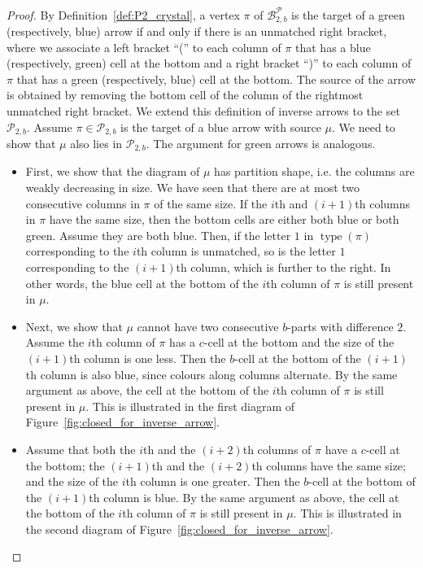 \documentclass[11pt]{article}
\theoremstyle{definition}
\theoremstyle{remark}
\theoremstyle{definition}
\numberwithin{equation}{section}
\newcommand{\type}{\operatorname{type}}
\begin{document}
\begin{proof}
By Definition~\ref{def:P2_crystal}, a vertex \(\pi\) of \(\mathcal{B}_{2,b}^{\mathcal{P}}\) is the target of a green (respectively, blue) arrow if and only if there is an unmatched right bracket, where we associate a left bracket ``('' to each column of \(\pi\) that has a blue (respectively, green) cell at the bottom and a right bracket ``)'' to each column of \(\pi\) that has a green (respectively, blue) cell at the bottom. The source of the arrow is obtained by removing the bottom cell of the column of the rightmost unmatched right bracket. We extend this definition of inverse arrows to the set \(\mathcal{P}_{2,b}\). Assume \(\pi\in\mathcal{P}_{2,b}\) is the target of a blue arrow with source \(\mu\). We need to show that \(\mu\) also lies in \(\mathcal{P}_{2,b}\). The argument for green arrows is analogous.
\begin{itemize}
\item First, we show that the diagram of \(\mu\) has partition shape, i.e. the columns are weakly decreasing in size. We have seen that there are at most two consecutive columns in \(\pi\) of the same size. If the \(i\)th and \((i+1)\)th columns in \(\pi\) have the same size, then the bottom cells are either both blue or both green. Assume they are both blue. Then, if the letter \(1\) in \(\type(\pi)\) corresponding to the \(i\)th column is unmatched, so is the letter \(1\) corresponding to the \((i+1)\)th column, which is further to the right. In other words, the blue cell at the bottom of the \(i\)th column of \(\pi\) is still present in \(\mu\).
\item Next, we show that \(\mu\) cannot have two consecutive \(b\)-parts with difference \(2\). Assume the \(i\)th column of \(\pi\) has a \(c\)-cell at the bottom and the size of the \((i+1)\)th column is one less. Then the \(b\)-cell at the bottom of the \((i+1)\)th column is also blue, since colours along columns alternate. By the same argument as above, the cell at the bottom of the \(i\)th column of \(\pi\) is still present in \(\mu\). This is illustrated in the first diagram of Figure~\ref{fig:closed_for_inverse_arrow}.
\item Assume that both the \(i\)th and the \((i+2)\)th columns of \(\pi\) have a \(c\)-cell at the bottom; the \((i+1)\)th and the \((i+2)\)th columns have the same size; and the size of the \(i\)th column is one greater. Then the \(b\)-cell at the bottom of the \((i+1)\)th column is blue. By the same argument as above, the cell at the bottom of the \(i\)th column of \(\pi\) is still present in \(\mu\). This is illustrated in the second diagram of Figure~\ref{fig:closed_for_inverse_arrow}.

\end{itemize}
\end{proof}
\end{document}
